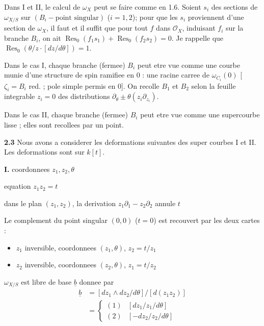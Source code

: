 \documentclass[11pt,a4paper]{article}
\theoremstyle{plain}
\theoremstyle{definition}
\DeclareMathOperator{\Res}{Res}
\begin{document}
Dans I et II, le calcul de $\omega_X$ peut se faire comme en 1.6. Soient $s_i$ des sections de $\omega_{X/S}$ sur $(B_i - \text{point singular})$ ($i = 1,2$); pour que les $s_i$ proviennent d'une section de $\omega_X$, il faut et il suffit que pour tout $f$ dans $\mathcal{O}_X$, induisant $f_i$ sur la branche $B_i$, on ait $\Res_0(f_1 s_1) + \Res_0(f_2 s_2) = 0$. Je rappelle que $\Res_0(\theta/z \cdot [dz/d\theta]) = 1$.

Dans le cas I, chaque branche (fermee) $B_i$ peut etre vue comme une courbe munie d'une structure de spin ramifiee en 0 : une racine carree de $\omega_{C_i}(0)$ [$\zeta_i = B_i$ red. ; pole simple permis en 0]. On recolle $B_1$ et $B_2$ selon la feuille integrable $z_i = 0$ des distributions $\partial_\theta \pm \theta(z_i\partial_{z_i})$.

Dans le cas II, chaque branche (fermee) $B_i$ peut etre vue comme une supercourbe lisse ; elles sont recollees par un point.

\newpage

\noindent \textbf{2.3} Nous avons a considerer les deformations suivantes des super courbes I et II. Les deformations sont sur $k[t]$.

\medskip

\noindent \textbf{I.} coordonnees $z_1, z_2, \theta$

equation $z_1 z_2 = t$ \hfill \begin{minipage}{5cm}\small dans le plan $(z_1,z_2)$, la derivation $z_1\partial_1 - z_2\partial_2$ annule $t$\end{minipage}

Le complement du point singular $(0,0)$ ($t=0$) est recouvert par les deux cartes :
\begin{itemize}
\item[(1)] $z_1$ inversible, coordonnees $(z_1, \theta)$, $z_2 = t/z_1$
\item[(2)] $z_2$ inversible, coordonnees $(z_2, \theta)$, $z_1 = t/z_2$
\end{itemize}

$\omega_{X/S}$ est libre de base $\underline{b}$ donnee par
\[
\begin{aligned}
\underline{b} &= [dz_1 \wedge dz_2 / d\theta] / [d(z_1 z_2)] \\
&= \begin{cases} (1) & [dz_1/z_1 / d\theta] \\ (2) & [-dz_2/z_2 / d\theta] \end{cases}
\end{aligned}
\]
\end{document}
